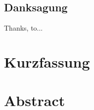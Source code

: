 \documentclass[12pt]{article}
\begin{document}
%
%

\begin{center}
	\section*{Danksagung}
\end{center}
\markright{ } %
\vspace{1cm}
Thanks, to...
\thispagestyle{empty}
\cleardoublepage



\section*{Kurzfassung}
\lipsum[8]

\section*{Abstract}
\lipsum[8]
\cleardoublepage
\end{document}
